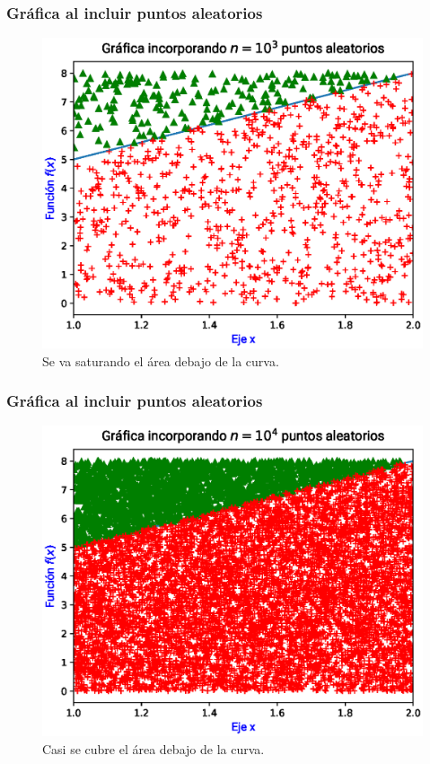 \begin{frame}
\frametitle{Gráfica al incluir puntos aleatorios}
\begin{figure}
    \centering
    \includegraphics[scale=0.55]{Imagenes/area_puntos_03.eps}
    \caption{Se va saturando el área debajo de la curva.}
\end{figure}
\end{frame}
\begin{frame}
\frametitle{Gráfica al incluir puntos aleatorios}
\begin{figure}
    \centering
    \includegraphics[scale=0.55]{Imagenes/area_puntos_04.eps}
    \caption{Casi se cubre el área debajo de la curva.}
\end{figure}
\end{frame}
